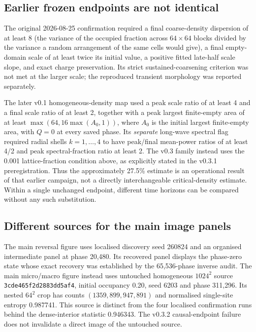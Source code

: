 \documentclass[11pt,a4paper]{article}
\newcommand{\code}[1]{\texttt{#1}}
\begin{document}
\subsection{Earlier frozen endpoints are not identical}
The original 2026-08-25 confirmation required a final coarse-density dispersion of at least 8 (the variance of the occupied fraction across $64\times64$ blocks divided by the variance a random arrangement of the same cells would give), a final empty-domain scale of at least twice its initial value, a positive fitted late-half scale slope, and exact charge preservation. Its strict sustained-coarsening criterion was not met at the larger scale; the reproduced transient morphology was reported separately.

The later v0.1 homogeneous-density map used a peak scale ratio of at least 4 and a final scale ratio of at least 2, together with a peak largest finite-empty area of at least $\max(64,16\max(A_0,1))$, where $A_0$ is the initial largest finite-empty area, with $Q=0$ at every saved phase. Its \emph{separate} long-wave spectral flag required radial shells $k=1,\ldots,4$ to have peak/final mean-power ratios of at least 4/2 and peak spectral-fraction ratio at least 2. The v0.3 family instead uses the 0.001 lattice-fraction condition above, as explicitly stated in the v0.3.1 preregistration. Thus the approximately 27.5\% estimate is an operational result of that earlier campaign, not a directly interchangeable critical-density estimate. Within a single unchanged endpoint, different time horizons can be compared without any such substitution.

\subsection{Different sources for the main image panels}
The main reversal figure uses localised discovery seed 260824 and an organised intermediate panel at phase 20,480. Its recovered panel displays the phase-zero state whose exact recovery was established by the 65,536-phase inverse audit. The main micro/macro figure instead uses untouched homogeneous $1024^2$ source \code{3cde465f2d2883dd5af4}, initial occupancy 0.20, seed 6203 and phase 311,296. Its nested $64^2$ crop has counts $(1359,899,947,891)$ and normalised single-site entropy 0.987741. This source is distinct from the four localised confirmation runs behind the dense-interior statistic 0.946343. The v0.3.2 causal-endpoint failure does not invalidate a direct image of the untouched source.
\end{document}
